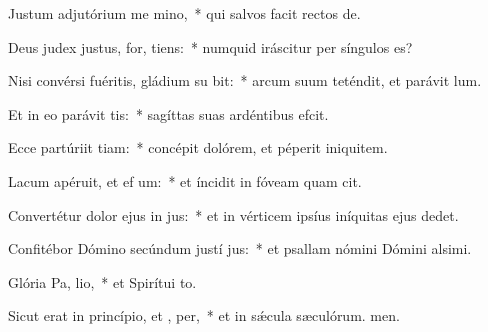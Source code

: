 \item Justum adjutórium me  mino,~* qui salvos facit rectos de.
\item Deus judex justus, for,  tiens:~* numquid iráscitur per síngulos es?
\item Nisi convérsi fuéritis, gládium su bit:~* arcum suum teténdit, et parávit lum.
\item Et in eo parávit  tis:~* sagíttas suas ardéntibus efcit.
\item Ecce partúriit tiam:~* concépit dolórem, et péperit iniquitem.
\item Lacum apéruit, et ef um:~* et íncidit in fóveam quam cit.
\item Convertétur dolor ejus in  jus:~* et in vérticem ipsíus iníquitas ejus dedet.
\item Confitébor Dómino secúndum justí jus:~* et psallam nómini Dómini alsimi.
\item Glória Pa,  lio,~* et Spirítui to.
\item Sicut erat in princípio, et ,  per,~* et in sǽcula sæculórum. men.
